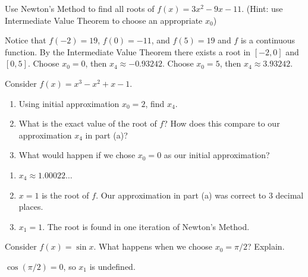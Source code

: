 \begin{enumialphparenastyle}

\begin{ex} 
Use Newton's Method to find all roots of $f(x)=3x^2-9x-11$. (Hint: use Intermediate Value Theorem to choose an appropriate $x_0$)
\begin{sol}
	Notice that $f(-2)=19$, $f(0)=-11$, and $f(5)=19$ and $f$ is a continuous function. By the
	Intermediate Value Theorem there exists a root in $[-2,0]$ and $[0,5]$. Choose $x_0=0$, then $x_4\approx -0.93242$.
	Choose $x_0=5$, then $x_4\approx 3.93242$.
\end{sol}
\end{ex}

\begin{ex} 
Consider $f(x)=x^3-x^2+x-1$.
\begin{enumerate}
	\item	Using initial approximation $x_0=2$, find $x_4$.
	\item	What is the exact value of the root of $f$? How does this compare to our approximation $x_4$ in part (a)?
	\item	What would happen if we chose $x_0=0$ as our initial approximation?
\end{enumerate}
\begin{sol}
\begin{enumerate}
	\item	$x_4\approx 1.00022\ldots$
	\item	$x=1$ is the root of $f$. Our approximation in part (a) was correct to 3 decimal places.
	\item	$x_1=1$. The root is found in one iteration of Newton's Method.
\end{enumerate}
\end{sol}
\end{ex}

\begin{ex} 
Consider $f(x)=\sin x$. What happens when we choose $x_0=\pi/2$? Explain.
\begin{sol}
	$\cos (\pi/2)=0$, so $x_1$ is undefined.
\end{sol}
\end{ex}

\end{enumialphparenastyle}